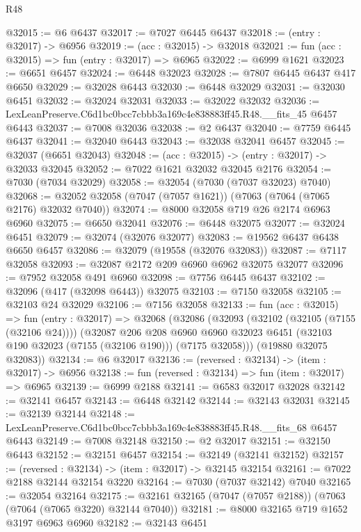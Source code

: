 \begin{lexlean}{R48}
\begin{coremodule}
@32015 := @6 @6437
@32017 := @7027 @6445 @6437
@32018 := (entry : @32017) -> @6956
@32019 := (acc : @32015) -> @32018
@32021 := fun (acc : @32015) => fun (entry : @32017) => @6965
@32022 := @6999 @1621
@32023 := @6651 @6457
@32024 := @6448 @32023
@32028 := @7807 @6445 @6437 @417 @6650
@32029 := @32028 @6443
@32030 := @6448 @32029
@32031 := @32030 @6451
@32032 := @32024 @32031
@32033 := @32022 @32032
@32036 := LexLeanPreserve.C6d1bc0bcc7cbbb3a169c4e838883ff45.R48.__fits_45 @6457 @6443
@32037 := @7008 @32036
@32038 := @2 @6437
@32040 := @7759 @6445 @6437
@32041 := @32040 @6443
@32043 := @32038 @32041 @6457
@32045 := @32037 (@6651 @32043)
@32048 := (acc : @32015) -> (entry : @32017) -> @32033 @32045
@32052 := @7022 @1621 @32032 @32045 @2176
@32054 := @7030 (@7034 @32029)
@32058 := @32054 (@7030 (@7037 @32023) @7040)
@32068 := @32052 @32058 (@7047 (@7057 @1621)) (@7063 (@7064 (@7065 @2176) @32032 @7040))
@32074 := @8000 @32058 @719 @26 @2174 @6963 @6960
@32075 := @6650 @32041
@32076 := @6448 @32075
@32077 := @32024 @6451
@32079 := @32074 (@32076 @32077)
@32083 := @19562 @6437 @6438 @6650 @6457
@32086 := @32079 (@19558 (@32076 @32083))
@32087 := @7117 @32058
@32093 := @32087 @2172 @209 @6960 @6962 @32075 @32077
@32096 := @7952 @32058 @491 @6960
@32098 := @7756 @6445 @6437
@32102 := @32096 (@417 (@32098 @6443)) @32075
@32103 := @7150 @32058
@32105 := @32103 @24 @32029
@32106 := @7156 @32058
@32133 := fun (acc : @32015) =>
  fun (entry : @32017) =>
  @32068
    (@32086
      (@32093
        (@32102 (@32105 (@7155 (@32106 @24))))
        (@32087
          @206
          @208
          @6960
          @6960
          @32023
          @6451
          (@32103 @190 @32023 (@7155 (@32106 @190)))
          (@7175 @32058)))
      (@19880 @32075 @32083))
@32134 := @6 @32017
@32136 := (reversed : @32134) -> (item : @32017) -> @6956
@32138 := fun (reversed : @32134) => fun (item : @32017) => @6965
@32139 := @6999 @2188
@32141 := @6583 @32017 @32028
@32142 := @32141 @6457
@32143 := @6448 @32142
@32144 := @32143 @32031
@32145 := @32139 @32144
@32148 := LexLeanPreserve.C6d1bc0bcc7cbbb3a169c4e838883ff45.R48.__fits_68 @6457 @6443
@32149 := @7008 @32148
@32150 := @2 @32017
@32151 := @32150 @6443
@32152 := @32151 @6457
@32154 := @32149 (@32141 @32152)
@32157 := (reversed : @32134) -> (item : @32017) -> @32145 @32154
@32161 := @7022 @2188 @32144 @32154 @3220
@32164 := @7030 (@7037 @32142) @7040
@32165 := @32054 @32164
@32175 := @32161 @32165 (@7047 (@7057 @2188)) (@7063 (@7064 (@7065 @3220) @32144 @7040))
@32181 := @8000 @32165 @719 @1652 @3197 @6963 @6960
@32182 := @32143 @6451

\end{coremodule}
\end{lexlean}
